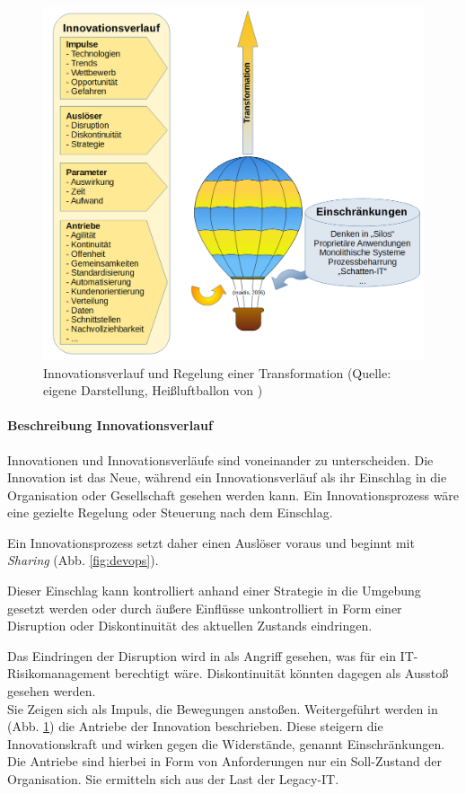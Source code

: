 \begin{figure}[htbp]
 \centering
 \includegraphics[width=1.0\textwidth]{gfx/digital-transformation-lifecycle-by-selim3.PNG}
 \caption{Innovationsverlauf und Regelung einer Transformation (Quelle: eigene Darstellung, Heißluftballon von \citet{maidis_2006})\label{fig:digit-trans}
 }
\end{figure}
%
\paragraph{Beschreibung Innovationsverlauf}
Innovationen und Innovationsverläufe sind voneinander zu unterscheiden. Die Innovation ist das Neue, während ein Innovationsverläuf als ihr Einschlag in die Organisation oder Gesellschaft gesehen werden kann. Ein Innovationsprozess wäre eine gezielte Regelung oder Steuerung nach dem Einschlag.

Ein Innovationsprozess setzt daher einen Auslöser voraus und beginnt mit \emph{Sharing} (Abb. \ref{fig:devops}).

Dieser Einschlag kann kontrolliert anhand einer Strategie in die Umgebung gesetzt werden oder durch äußere Einflüsse unkontrolliert in Form einer Disruption oder Diskontinuität \cite{Fernandez:2020} des aktuellen Zustands eindringen.

Das Eindringen der Disruption wird in \cite{Fernandez:2020, eba:2019} als Angriff gesehen, was für ein IT-Risikomanagement berechtigt wäre.
Diskontinuität könnten dagegen als Ausstoß gesehen werden.
\medskip
\\
Sie Zeigen sich als Impuls, die Bewegungen anstoßen.
Weitergeführt werden in (Abb. \ref{fig:digit-trans}) die Antriebe der Innovation beschrieben. Diese steigern die Innovationskraft und wirken gegen die Widerstände, genannt Einschränkungen. Die Antriebe sind hierbei in Form von Anforderungen nur ein Soll-Zustand der Organisation. Sie ermitteln sich aus der Last der Legacy-IT. 
%
